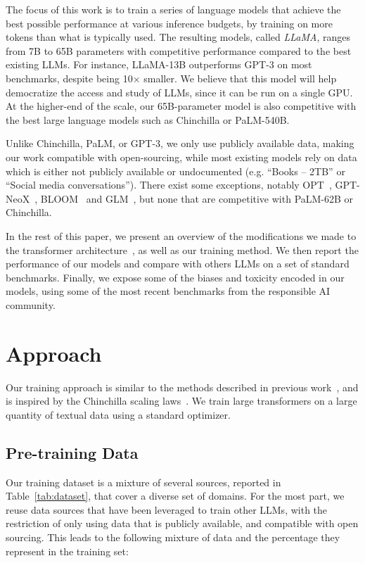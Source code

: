 \documentclass[11pt]{article}
\newcommand{\model}{LLaMA\xspace}
\begin{document}
 The focus of this work is to train a series of language models that achieve the best possible performance at various inference budgets, by training on more tokens than what is typically used.
The resulting models, called \emph{\model}, ranges from 7B to 65B parameters with competitive performance compared to the best existing LLMs.
For instance, \model-13B outperforms GPT-3 on most benchmarks, despite being 10$\times$ smaller.
We believe that this model will help democratize the access and study of LLMs, since it can be run on a single GPU.
At the higher-end of the scale, our 65B-parameter model is also competitive with the best large language models such as Chinchilla or PaLM-540B.

 Unlike Chinchilla, PaLM, or GPT-3, we only use publicly available data, making our work compatible with open-sourcing, while most existing models rely on data which is either not publicly available or undocumented (e.g. ``Books -- 2TB'' or ``Social media conversations'').
There exist some exceptions, notably OPT~\citep{zhang2022opt}, GPT-NeoX~\citep{black2022gpt}, BLOOM~\citep{scao2022bloom} and GLM~\citep{zhengGLM2022}, but none that are competitive with PaLM-62B or Chinchilla.

In the rest of this paper, we present an overview of the modifications we made to the transformer architecture~\cite{vaswaniAttention2017}, as well as our training method. 
We then report the performance of our models and compare with others LLMs on a set of standard benchmarks.
Finally, we expose some of the biases and toxicity encoded in our models, using some of the most recent benchmarks from the responsible AI community.

\section{Approach}
Our training approach is similar to the methods described in previous work~\cite{brown2020gpt3,chowdhery2022palm}, and is inspired by the Chinchilla scaling laws~\cite{hoffmann2022chinchilla}.
We train large transformers on a large quantity of textual data using a standard optimizer.

\subsection{Pre-training Data}
Our training dataset is a mixture of several sources, reported in Table~\ref{tab:dataset}, that cover a diverse set of domains.
For the most part, we reuse data sources that have been leveraged to train other LLMs, with the restriction of only using data that is publicly available, and compatible with open sourcing.
This leads to the following mixture of data and the percentage they represent in the training set:
\end{document}
